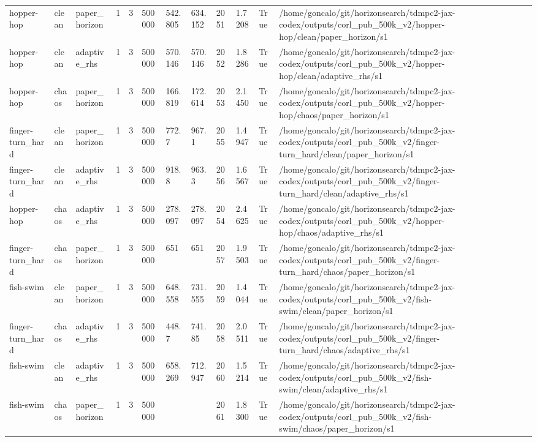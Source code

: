 \begin{tabular}{llllllllllll}
hopper-hop & clean & paper\_horizon & 1 & 3 & 500000 & 542.805 & 634.152 & 2051 & 1.7208 & True & /home/goncalo/git/horizonsearch/tdmpc2-jax-codex/outputs/corl\_pub\_500k\_v2/hopper-hop/clean/paper\_horizon/s1 \\
hopper-hop & clean & adaptive\_rhs & 1 & 3 & 500000 & 570.146 & 570.146 & 2052 & 1.8286 & True & /home/goncalo/git/horizonsearch/tdmpc2-jax-codex/outputs/corl\_pub\_500k\_v2/hopper-hop/clean/adaptive\_rhs/s1 \\
hopper-hop & chaos & paper\_horizon & 1 & 3 & 500000 & 166.819 & 172.614 & 2053 & 2.1450 & True & /home/goncalo/git/horizonsearch/tdmpc2-jax-codex/outputs/corl\_pub\_500k\_v2/hopper-hop/chaos/paper\_horizon/s1 \\
finger-turn\_hard & clean & paper\_horizon & 1 & 3 & 500000 & 772.7 & 967.1 & 2055 & 1.4947 & True & /home/goncalo/git/horizonsearch/tdmpc2-jax-codex/outputs/corl\_pub\_500k\_v2/finger-turn\_hard/clean/paper\_horizon/s1 \\
finger-turn\_hard & clean & adaptive\_rhs & 1 & 3 & 500000 & 918.8 & 963.3 & 2056 & 1.6567 & True & /home/goncalo/git/horizonsearch/tdmpc2-jax-codex/outputs/corl\_pub\_500k\_v2/finger-turn\_hard/clean/adaptive\_rhs/s1 \\
hopper-hop & chaos & adaptive\_rhs & 1 & 3 & 500000 & 278.097 & 278.097 & 2054 & 2.4625 & True & /home/goncalo/git/horizonsearch/tdmpc2-jax-codex/outputs/corl\_pub\_500k\_v2/hopper-hop/chaos/adaptive\_rhs/s1 \\
finger-turn\_hard & chaos & paper\_horizon & 1 & 3 & 500000 & 651 & 651 & 2057 & 1.9503 & True & /home/goncalo/git/horizonsearch/tdmpc2-jax-codex/outputs/corl\_pub\_500k\_v2/finger-turn\_hard/chaos/paper\_horizon/s1 \\
fish-swim & clean & paper\_horizon & 1 & 3 & 500000 & 648.558 & 731.555 & 2059 & 1.4044 & True & /home/goncalo/git/horizonsearch/tdmpc2-jax-codex/outputs/corl\_pub\_500k\_v2/fish-swim/clean/paper\_horizon/s1 \\
finger-turn\_hard & chaos & adaptive\_rhs & 1 & 3 & 500000 & 448.7 & 741.85 & 2058 & 2.0511 & True & /home/goncalo/git/horizonsearch/tdmpc2-jax-codex/outputs/corl\_pub\_500k\_v2/finger-turn\_hard/chaos/adaptive\_rhs/s1 \\
fish-swim & clean & adaptive\_rhs & 1 & 3 & 500000 & 658.269 & 712.947 & 2060 & 1.5214 & True & /home/goncalo/git/horizonsearch/tdmpc2-jax-codex/outputs/corl\_pub\_500k\_v2/fish-swim/clean/adaptive\_rhs/s1 \\
fish-swim & chaos & paper\_horizon & 1 & 3 & 500000 &  &  & 2061 & 1.8300 & True & /home/goncalo/git/horizonsearch/tdmpc2-jax-codex/outputs/corl\_pub\_500k\_v2/fish-swim/chaos/paper\_horizon/s1 \\

\end{tabular}
